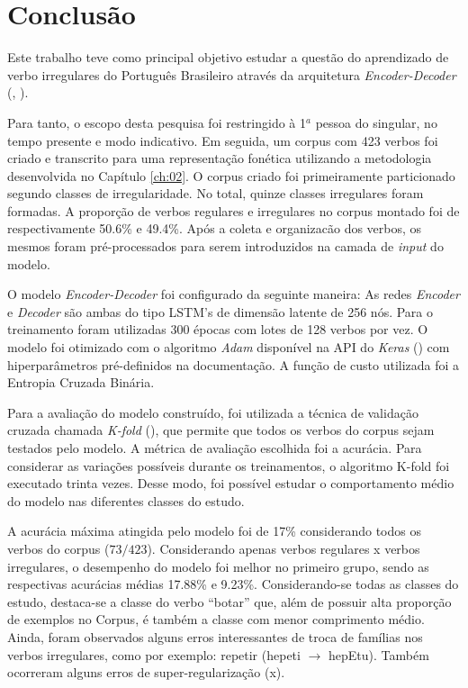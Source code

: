 \chapter{Conclusão}
\label{ch:08}

Este trabalho teve como principal objetivo estudar a questão do aprendizado de verbo irregulares do Português Brasileiro através da arquitetura \textit{Encoder-Decoder} (\cite{enc-dec:2014}, \cite{seq2seq:2014}). 

Para tanto, o escopo desta pesquisa foi restringido à 1$^{a}$ pessoa do singular, no tempo presente e modo indicativo. Em seguida, um corpus com 423 verbos foi criado e transcrito para uma representação fonética utilizando a metodologia desenvolvida no Capítulo \ref{ch:02}. O corpus criado foi primeiramente particionado segundo classes de irregularidade. No total, quinze classes irregulares foram formadas. A proporção de verbos regulares e irregulares no corpus montado foi de respectivamente 50.6\% e 49.4\%. Após a coleta e organizacão dos verbos, os mesmos foram pré-processados para serem introduzidos na camada de \textit{input} do modelo. 

O modelo \textit{Encoder-Decoder} foi configurado da seguinte maneira: As redes \textit{Encoder} e \textit{Decoder} são ambas do tipo LSTM's de dimensão latente de 256 nós. Para o treinamento foram utilizadas 300 épocas com lotes de 128 verbos por vez. O modelo foi otimizado com o algoritmo \textit{Adam} disponível na API do \textit{Keras} (\cite{chollet2015keras}) com hiperparâmetros pré-definidos na documentação. A função de custo utilizada foi a Entropia Cruzada Binária.

Para a avaliação do modelo construído, foi utilizada a técnica de validação cruzada chamada \textit{K-fold} (\cite{kfold:2018}), que permite que todos os verbos do corpus sejam testados pelo modelo. A métrica de avaliação escolhida foi a acurácia. Para considerar as variações possíveis durante os treinamentos, o algoritmo K-fold foi executado trinta vezes. Desse modo, foi possível estudar o comportamento médio do modelo nas diferentes classes do estudo.

A acurácia máxima atingida pelo modelo foi de 17\% considerando todos os verbos do corpus ($73/423$). Considerando apenas verbos regulares x verbos irregulares, o desempenho do modelo foi melhor no primeiro grupo, sendo as respectivas acurácias médias 17.88\% e 9.23\%. Considerando-se todas as classes do estudo, destaca-se a classe do verbo “botar” que, além de possuir alta proporção de exemplos no Corpus, é também a classe com menor comprimento médio. Ainda, foram observados alguns erros interessantes de troca de famílias nos verbos irregulares, como por exemplo: repetir (hepeti $\rightarrow$ hepEtu). Também ocorreram alguns erros de super-regularização (x). 

